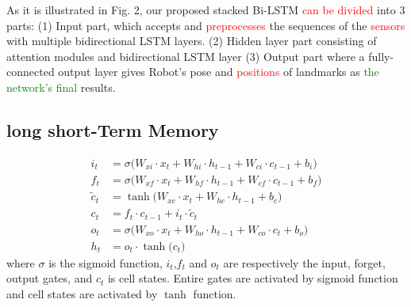 \documentclass{ieeeaccess}
\begin{document}
As it is illustrated in Fig. 2, our proposed stacked Bi-LSTM \textcolor{red}{can be divided} into 3 parts: (1) Input part, which accepts and \textcolor{red}{preprocesses} the sequences of the \textcolor{red}{sensors} with multiple bidirectional LSTM layers. (2) Hidden layer part consisting of attention modules and bidirectional LSTM layer (3) Output part where a fully-connected output layer gives Robot’s pose and \textcolor{red}{positions} of landmarks as \textcolor{green}{the network's final} results. 

\subsection{long short-Term Memory}

\begin{align}
i_{t} & =\sigma\big(W_{xi}\cdot x_{t}+W_{hi}\cdot h_{t-1}+W_{ci}\cdot c_{t-1}+b_{i}\big)\\
f_{t} & =\sigma\big(W_{xf}\cdot x_{t}+W_{hf}\cdot h_{t-1}+W_{cf}\cdot c_{t-1}+b_{f}\big)\\
\tilde{c}_{t} & = \tanh\big(W_{xc}\cdot x_{t}+W_{hc}\cdot h_{t-1}+b_{c}\big)\\
c_{t} & =f_{t}\cdot c_{t-1}+i_{t}\cdot\tilde{c}_{t}\\
o_{t} & =\sigma\big(W_{xo}\cdot x_{t}+W_{ho}\cdot h_{t-1}+W_{co}\cdot c_{t}+b_{o}\big)\\
h_{t} & =o_{t}\cdot \tanh\big(c_{t}\big)
\end{align}
where $\sigma$ is the sigmoid function, $i_{t}$,$f_{t}$ and $o_{t}$ are respectively the input, forget, output gates, and $c_{t}$ is cell states. Entire gates are activated by sigmoid function and cell states are activated by $\tanh$ function.
\end{document}
